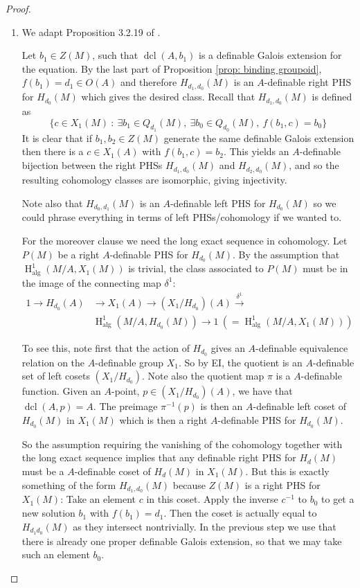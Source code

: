 \documentclass{amsart}
\theoremstyle{definition}
\theoremstyle{remark}
\numberwithin{equation}{section}
\def \HH {\operatorname{H}}
\def \alg {\operatorname{alg}}
\def \dcl {\operatorname{dcl}}
\begin{document}
\begin{proof}
\begin{enumerate}
\item We adapt Proposition 3.2.19 of \cite{MeretzkyThesis}. 
    
Let $b_1 \in Z(M)$, such that $\dcl(A,b_1)$ is a definable Galois extension for the equation. By the last part of Proposition \ref{prop: binding groupoid}, $f(b_1) = d_1 \in O(A)$ and therefore $H_{d_1,d_0}(M)$ is an $A$-definable right PHS for $H_{d_0}(M)$ which gives the desired class. Recall that $H_{d_1,d_0}(M)$ is defined as $$\{c \in X_1(M) \ : \   
\exists b_1 \in Q_{d_1}(M), \  \exists b_0 \in Q_{d_0}(M), \  f(b_1,c) = b_0\}$$ 
It is clear that if $b_1,b_2 \in Z(M)$ generate the same definable Galois extension then there is a $c \in X_1(A)$ with $f(b_1,c) = b_2$. This yields an $A$-definable bijection between the right PHSs $H_{d_1,d_0}(M)$ and $H_{d_2,d_0}(M)$, and so the resulting cohomology classes are isomorphic, giving injectivity.

Note also that $H_{d_0,d_1}(M)$ is an $A$-definable left PHS for $H_{d_0}(M)$ so we could phrase everything in terms of left PHSs/cohomology if we wanted to.

For the moreover clause we need the long exact sequence in cohomology. Let $P(M)$ be a right $A$-definable PHS for $H_{d_0}(M)$. By the assumption that $\HH^1_{\alg}(M/A,X_1(M))$ is trivial, the class associated to $P(M)$ must be in the image of the connecting map $\delta^1$:
    \begin{align*}
        1  \to H_{d_0}(A) &\to X_1(A) \to (X_1/H_{d_0})(A) \xrightarrow{\delta^1} \\
        & \HH^1_{\alg}(M/A,H_{d_0}(M)) \to 1 \  (= \HH^1_{\alg}(M/A,X_1(M)))
    \end{align*}

    To see this, note first that the action of $H_{d_0}$ gives an $A$-definable equivalence relation on the $A$-definable group $X_1$. So by EI, the quotient is an $A$-definable set of left cosets $(X_1/H_{d_0})$. Note also the quotient map $\pi$ is a $A$-definable function. Given an $A$-point, $p \in (X_1/H_{d_0})(A)$, we have that $\dcl(A,p) = A$. The preimage $\pi^{-1}(p)$ is then an $A$-definable left coset of $H_{d_0}(M)$ in $X_1(M)$ which is then a right $A$-definable PHS for 
    $H_{d_0}(M)$. 
    
    So the assumption requiring the vanishing of the cohomology together with the long exact sequence implies that any definable right PHS for $H_{d}(M)$ must be a $A$-definable coset of $H_{d}(M)$ in $X_1(M)$. But this is exactly something of the form $H_{d_1,d_0}(M)$ because $Z(M)$ is a right PHS for $X_1(M)$: Take an element $c$ in this coset. Apply the inverse $c^{-1}$ to $b_0$ to get a new solution $b_1$ with $f(b_1) = d_1$. Then the coset is actually equal to $H_{d_1d_0}(M)$ as they intersect nontrivially. In the previous step we use that there is already one proper definable Galois extension, so that we may take such an element $b_0$.
    \end{enumerate}
\end{proof}
\end{document}
